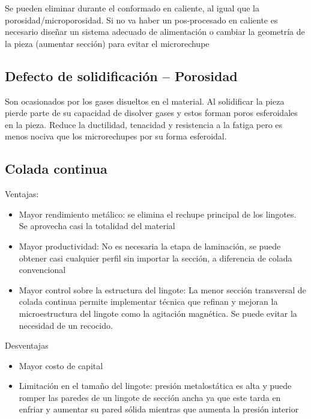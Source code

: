Se pueden eliminar durante el conformado en caliente, al igual que la porosidad/microporosidad. Si no va haber un pos-procesado en caliente es necesario diseñar un sistema adecuado de alimentación o cambiar la geometría de la pieza (aumentar sección) para evitar el microrechupe


\subsection[Porosidad]{Defecto de solidificación -- Porosidad}
Son ocasionados por los gases disueltos en el material. Al solidificar la pieza pierde parte de su capacidad de disolver gases y estos forman poros esferoidales en la pieza. Reduce la ductilidad, tenacidad y resistencia a la fatiga pero es menos nociva que los microrechupes por su forma esferoidal.


\subsection{Colada continua}

Ventajas:

\begin{itemize}
	\item Mayor rendimiento metálico: se elimina el rechupe principal de los lingotes. Se aprovecha casi la totalidad del material
	\item Mayor productividad: No es necesaria la etapa de laminación, se puede obtener casi cualquier perfil sin importar la sección, a diferencia de colada convencional
	\item Mayor control sobre la estructura del lingote: La menor sección transversal de colada continua permite implementar técnica que refinan y mejoran la microestructura del lingote como la agitación magnética. Se puede evitar la necesidad de un recocido.
\end{itemize}

Desventajas

\begin{itemize}
	\item Mayor costo de capital
	\item Limitación en el tamaño del lingote: presión metalostática es alta y puede romper las paredes de un lingote de sección ancha ya que este tarda en enfriar y aumentar su pared sólida mientras que aumenta la presión interior
\end{itemize}